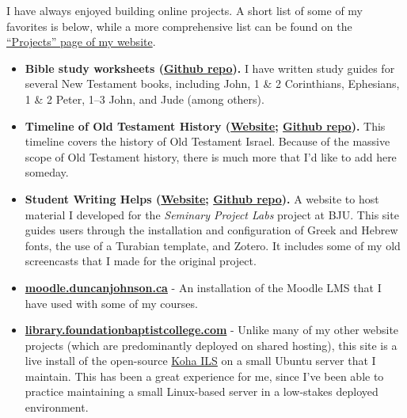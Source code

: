 
I have always enjoyed building online projects. A short list of some of my favorites is below, while a more comprehensive list can be found on the \href{http://duncanjohnson.ca/projects/}{``Projects'' page of my website}.

\begin{itemize}
\item \textbf{Bible study worksheets (\href{https://github.com/dtjohnso/bible-study-worksheets}{Github repo}).} I have written study guides for several New Testament books, including John, 1 \& 2 Corinthians, Ephesians, 1 \& 2 Peter, 1--3 John, and Jude (among others).
\item \textbf{Timeline of Old Testament History (\href{http://duncanjohnson.ca/OT-Timeline/}{Website}; \href{https://github.com/dtjohnso/OT-Timeline}{Github repo}).} This timeline covers the history of Old Testament Israel. Because of the massive scope of Old Testament history, there is much more that I'd like to add here someday.
\item \textbf{Student Writing Helps (\href{http://duncanjohnson.ca/Student-Writing-Helps/}{Website}; \href{https://github.com/dtjohnso/Student-Writing-Helps}{Github repo}).} A website to host material I developed for the \textit{Seminary Project Labs} project at BJU. This site guides users through the installation and configuration of Greek and Hebrew fonts, the use of a Turabian template, and Zotero. It includes some of my old screencasts that I made for the original project.
\item \textbf{\href{http://moodle.duncanjohnson.ca/}{moodle.duncanjohnson.ca}} - An installation of the Moodle LMS that I have used with some of my courses.
\item \textbf{\href{http://library.foundationbaptistcollege.com/}{library.foundationbaptistcollege.com}} - Unlike many of my other website projects (which are predominantly deployed on shared hosting), this site is a live install of the open-source \href{https://koha-community.org/}{Koha ILS} on a small Ubuntu server that I maintain. This has been a great experience for me, since I've been able to practice maintaining a small Linux-based server in a low-stakes deployed environment.
\end{itemize}